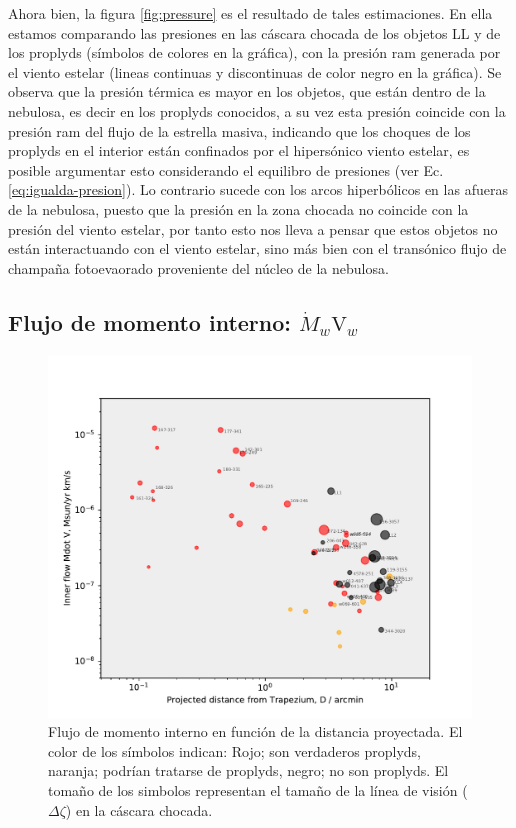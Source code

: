 Ahora bien, la figura \ref{fig:pressure} es el resultado de tales estimaciones. En ella estamos comparando las presiones en las cáscara chocada de los objetos LL y de los proplyds (símbolos de colores en la gráfica), con la presión ram generada por el viento estelar (lineas continuas  y discontinuas  de color  negro en la gráfica). Se observa  que la presión térmica es mayor en los objetos, que están dentro de la nebulosa,  es decir en los proplyds conocidos, a su vez esta  presión coincide con la presión ram del flujo de la estrella masiva, indicando que los choques de los proplyds en el interior están confinados por el hipersónico viento estelar, es posible argumentar esto considerando el equilibro de presiones (ver Ec. \ref{eq:igualda-presion}). Lo contrario sucede con los arcos hiperbólicos en las afueras de la nebulosa, puesto que la presión en la zona chocada no coincide con la presión del viento estelar, por tanto esto nos lleva a pensar que estos objetos no están interactuando con el viento estelar, sino más bien con el transónico flujo de champaña fotoevaorado proveniente del núcleo de la nebulosa.  

\subsection{Flujo de momento interno: \(\dot{M}_{w}\text{V}_{w}\) }
\label{sec:momentum}

\begin{figure}
  \centering
  \includegraphics[width=\linewidth, clip]{luis-programas/will-MdotV-vs-D.pdf}
  \caption{Flujo de momento interno  en función de la distancia proyectada. El color de los símbolos indican: Rojo; son verdaderos proplyds, naranja; podrían tratarse de proplyds, negro; no son proplyds. El tomaño de los simbolos representan el tamaño de la línea de visión (\(\Delta\zeta\)) en la cáscara chocada.  }
 \label{fig:flow}
\end{figure}


